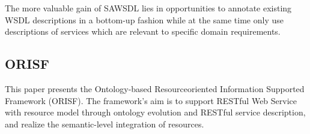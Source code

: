 The more valuable
gain of SAWSDL lies in opportunities to annotate existing
WSDL descriptions in a bottom-up fashion while at the
same time only use descriptions of services which are relevant
to specific domain requirements. \cite{WSMOLITE}

\subsection{ORISF}

This paper presents the Ontology-based Resourceoriented
Information Supported Framework (ORISF). The
framework’s aim is to support RESTful Web Service with
resource model through ontology evolution and RESTful
service description, and realize the semantic-level
integration of resources. \cite{zg-ontorest}

